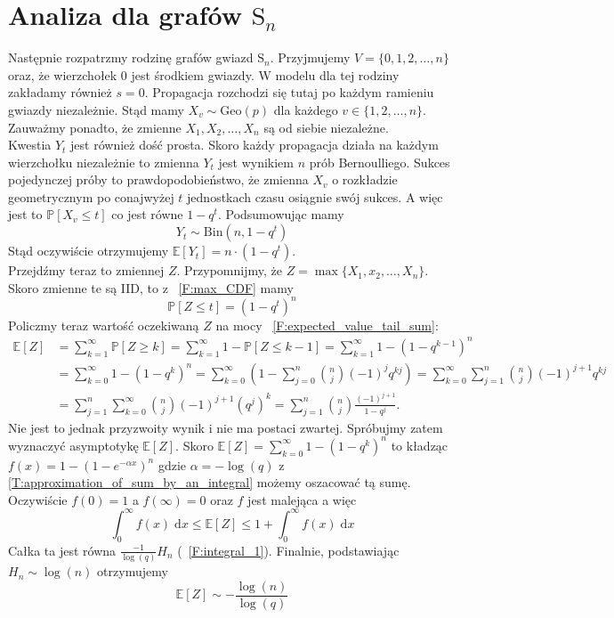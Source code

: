 \section{Analiza dla grafów $\mathrm{S}_n$}

Następnie rozpatrzmy rodzinę grafów gwiazd $\mathrm{S}_n$. Przyjmujemy $V=\{0,1,2,\dots,n\}$ oraz, że wierzchołek $0$ jest środkiem gwiazdy. W modelu dla tej rodziny zakładamy również $s=0$. Propagacja rozchodzi się tutaj po każdym ramieniu gwiazdy niezależnie. 
Stąd mamy $X_v \sim \mathrm{Geo}(p)$ dla każdego $v\in\{1,2,\dots,n\}$. Zauważmy ponadto, że zmienne $X_1,X_2,\dots,X_n$ są od siebie niezależne.\\

Kwestia $Y_t$ jest również dość prosta. Skoro każdy propagacja działa na każdym wierzchołku niezależnie to zmienna $Y_t$ jest wynikiem $n$ prób Bernoulliego. Sukces pojedynczej próby to prawdopodobieństwo, że zmienna $X_v$ o rozkładzie geometrycznym po conajwyżej $t$ jednostkach czasu osiągnie swój sukces. A więc jest to $\mathbb{P}[X_v\le t]$ co jest równe $1-q^t$. Podsumowując mamy
\[
    Y_t \sim \mathrm{Bin}(n, 1-q^t)
\]
Stąd oczywiście otrzymujemy $\mathbb{E}[Y_t] = n\cdot (1-q^t)$. \\

Przejdźmy teraz to zmiennej $Z$. Przypomnijmy, że $Z=\max\{X_1,x_2,\dots,X_n\}$. Skoro zmienne te są IID, to z ~\ref{F:max_CDF} mamy 
\[
    \mathbb{P}[Z\le t] = (1-q^t)^n
\]
Policzmy teraz wartość oczekiwaną $Z$ na mocy ~\ref{F:expected_value_tail_sum}:
\begin{align*}
\mathbb{E}[Z] 
&= \sum_{k=1}^{\infty} \mathbb{P}[Z\ge k] 
 = \sum_{k=1}^{\infty} 1 - \mathbb{P}[Z\le k-1]
 = \sum_{k=1}^{\infty}  1 - (1-q^{k-1})^n  \\
&= \sum_{k=0}^{\infty}  1 - (1-q^k)^n 
 = \sum_{k=0}^{\infty} \left( 1 - \sum_{j=0}^{n} \binom{n}{j} (-1)^j q^{kj} \right) 
 = \sum_{k=0}^{\infty} \sum_{j=1}^{n} \binom{n}{j} (-1)^{j+1} q^{kj} \\
&= \sum_{j=1}^{n} \sum_{k=0}^{\infty} \binom{n}{j} (-1)^{j+1} (q^j)^k 
 = \sum_{j=1}^{n} \binom{n}{j} \frac{(-1)^{j+1}}{1-q^j}.
\end{align*}
Nie jest to jednak przyzwoity wynik i nie ma postaci zwartej. Spróbujmy zatem wyznaczyć asymptotykę $\mathbb{E}[Z]$. Skoro $\mathbb{E}[Z] = \sum_{k=0}^{\infty}  1 - (1-q^k)^n$ to kładząc $f(x) = 1 - (1 - e^{-\alpha x})^n$ gdzie $\alpha = -\log(q)$ z \ref{T:approximation_of_sum_by_an_integral} możemy oszacować tą sumę. Oczywiście $f(0)=1$ a $f(\infty)=0$ oraz $f$ jest malejąca a więc
\[
    \int_{0}^{\infty} f(x) \; \mathrm{d}x \le \mathbb{E}[Z] \le  1 + \int_{0}^{\infty} f(x) \; \mathrm{d}x
\]
Całka ta jest równa $\frac{-1}{\log(q)} H_n$ (~\ref{F:integral_1}). Finalnie, podstawiając $H_n \sim \log(n)$ otrzymujemy
\[
    \mathbb{E}[Z] \sim -\frac{\log(n)}{\log(q)}
\]


